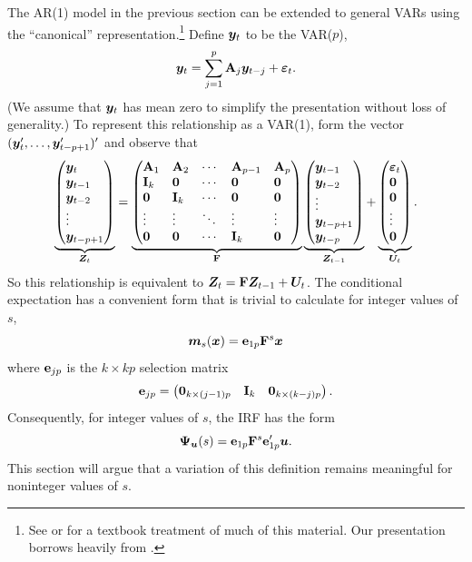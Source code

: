 \documentclass[AER,reviewmode]{tex/AEA}
\begin{document}
\noindent%
The AR(1) model in the previous section can be extended to general
VARs using the ``canonical'' representation.\footnote{%
  See \citet{Ham:94} or \citet{HaS:13} for a textbook treatment of
  much of this material. Our presentation borrows heavily from
  \citet{Ham:94}.} %
Define $\bm{y}_t$ to be the VAR($p$),
\[
\bm{y}_t = \sum_{j=1}^p \mathbf{A}_j \bm{y}_{t-j} + \bm{\varepsilon}_t.
\]
(We assume that $\bm{y}_t$ has mean zero to simplify the presentation
without loss of generality.) To represent this relationship as a
VAR(1), form the vector $(\bm{y}_t',\dots,\bm{y}_{t-p+1}')'$ and observe
that
\begin{equation}
\label{eq:7}
\underbrace{\begin{pmatrix*}[l]
  \yv_t \\ \yv_{t-1} \\ \yv_{t-2} \\ \vdots \\ \yv_{t-p+1}
\end{pmatrix*}}_{\Zv_t}
=
\underbrace{\begin{pmatrix*}[l]
  \Am_1 & \Am_2 & \cdots & \Am_{p-1} & \Am_p \\
  \Imat_k & \Omat   & \cdots & \Omat & \Omat \\
  \Omat  & \Imat_k  & \cdots & \Omat & \Omat \\
  \vdots & \vdots & \ddots & \vdots & \vdots \\
  \Omat & \Omat & \cdots & \Imat_k & \Omat
\end{pmatrix*}}_{\Fm}
\underbrace{\begin{pmatrix*}[l]
  \yv_{t-1} \\ \yv_{t-2} \\ \vdots \\ \yv_{t-p+1} \\ \yv_{t-p}
\end{pmatrix*}}_{\Zv_{t-1}}
+
\underbrace{\begin{pmatrix*}[l]
  \vepv_{t} \\ \Ovec \\ \Ovec \\ \vdots \\ \Ovec
\end{pmatrix*}}_{\Uv_t}.
\end{equation}
So this relationship is equivalent to $\bm{Z}_t = \mathbf{F} \bm{Z}_{t-1} + \bm{U}_t$. The
conditional expectation has a convenient form that is trivial to
calculate for integer values of $s$,
\begin{equation*}
  \bm{m}_s(\bm{x}) = \mathbf{e}_{1p} \mathbf{F}^s \bm{x}
\end{equation*}
where $\mathbf{e}_{jp}$ is the $k \times kp$ selection matrix
\begin{equation*}
  \emat_{jp} = \begin{pmatrix*}[l]
    \Omat_{k \times (j-1)p} & \Imat_k & \Omat_{k \times (k - j)p}
  \end{pmatrix*}.
\end{equation*}
Consequently, for integer values of $s$, the IRF has the form
\begin{equation*}
  \bm{\Psi}_{\bm{u}}(s) = \mathbf{e}_{1p} \mathbf{F}^s \mathbf{e}_{1p}' \bm{u}.
\end{equation*}
This section will argue that a variation of
this definition remains meaningful for noninteger values of $s$.
\end{document}
